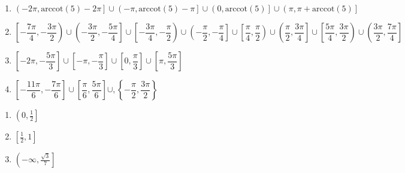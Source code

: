 \documentclass{ximera}
\begin{document}
\begin{enumerate}

\setcounter{enumi}{\value{HW}}

\item  $\left(-2\pi, \text{arccot}(5) - 2\pi\right] \cup \left(-\pi, \text{arccot}(5) - \pi\right] \cup \left(0, \text{arccot}(5)\right] \cup \left(\pi, \pi + \text{arccot}(5)\right]$

\item \scriptsize $\left[ -\dfrac{7\pi}{4}, -\dfrac{3\pi}{2} \right) \cup \left( -\dfrac{3\pi}{2}, -\dfrac{5\pi}{4} \right] \cup \left[ -\dfrac{3\pi}{4}, -\dfrac{\pi}{2} \right) \cup \left( -\dfrac{\pi}{2}, -\dfrac{\pi}{4} \right] \cup \left[ \dfrac{\pi}{4}, \dfrac{\pi}{2} \right) \cup \left( \dfrac{\pi}{2}, \dfrac{3\pi}{4} \right] \cup \left[ \dfrac{5\pi}{4}, \dfrac{3\pi}{2} \right) \cup \left( \dfrac{3\pi}{2}, \dfrac{7\pi}{4} \right]$ \normalsize

\item $\left[ -2\pi, -\dfrac{5\pi}{3} \right] \cup \left[ -\pi, -\dfrac{\pi}{3} \right] \cup \left[ 0, \dfrac{\pi}{3} \right] \cup \left[ \pi, \dfrac{5\pi}{3} \right]$

\item $\left[ -\dfrac{11\pi}{6},  -\dfrac{7\pi}{6} \right] \cup \left[ \dfrac{\pi}{6}, \dfrac{5\pi}{6} \right] \cup, \left\{ -\dfrac{\pi}{2}, \dfrac{3\pi}{2} \right\}$

\setcounter{HW}{\value{enumi}}

\end{enumerate}


\begin{multicols}{3}

\begin{enumerate}

\setcounter{enumi}{\value{HW}}

\item $\left(0, \frac{1}{2}\right]$ \vphantom{$\left(-\infty, \frac{\sqrt{3}}{7} \right]$}
\item $\left[\frac{1}{2}, 1\right]$ \vphantom{$\left(-\infty, \frac{\sqrt{3}}{7} \right]$}
\item $\left(-\infty, \frac{\sqrt{3}}{7} \right]$

\setcounter{HW}{\value{enumi}}

\end{enumerate}

\end{multicols}
\end{document}
